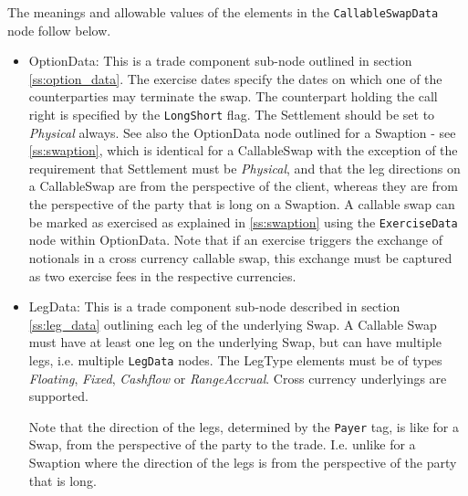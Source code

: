 The meanings and allowable values of the elements in the \lstinline!CallableSwapData!  node follow below.

\begin{itemize}

\item OptionData: This is a trade component sub-node outlined in section \ref{ss:option_data}. The exercise dates
  specify the dates on which one of the counterparties may terminate the swap. The counterpart holding the call right is
  specified by the {\tt LongShort} flag. The Settlement should be set to \emph{Physical} always. See also the OptionData
  node outlined for a Swaption - see \ref{ss:swaption}, which is identical for a CallableSwap with the exception of the
  requirement that Settlement must be \emph{Physical}, and that the leg directions on a CallableSwap are from the perspective of the client, whereas they are from the perspective of the party that is long on a Swaption. A callable swap can be marked as exercised as explained in
  \ref{ss:swaption} using the \lstinline!ExerciseData! node within OptionData. Note that if an exercise triggers the exchange of notionals in a cross currency callable swap, this exchange must be captured as two exercise fees in the respective currencies.

\item LegData: This is a trade component sub-node described in section \ref{ss:leg_data} outlining each leg of the
  underlying Swap. A Callable Swap must have at least one leg on the underlying Swap, but can have multiple legs,
  i.e. multiple \lstinline!LegData! nodes.  The LegType elements must be of types \emph{Floating}, \emph{Fixed},
  \emph{Cashflow} or \emph{RangeAccrual}. Cross currency underlyings are supported.
  
  Note that the direction of the legs, determined by the \lstinline!Payer! tag, is like for a Swap, from the perspective of the party to the trade. I.e. unlike for a Swaption where the direction of the legs is from the perspective of the party that is long. 

\end{itemize}

